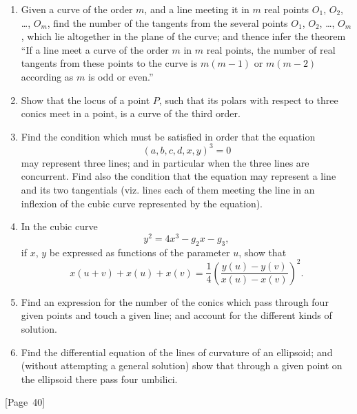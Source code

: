 \documentclass[11pt,a4paper]{book}
\providecommand{\between}{,}
\begin{document}
\begin{enumerate}
\item Given a curve of the order $m$, and a line meeting it in $m$ real
points $O_1$, $O_2$, \dots, $O_m$, find the number of the tangents from
the several points $O_1$, $O_2$, \dots, $O_m$, which lie altogether in the
plane of the curve; and thence infer the theorem ``If a line meet a
curve of the order $m$ in $m$ real points, the number of real tangents
from these points to the curve is $m(m-1)$ or $m(m-2)$ according as $m$
is odd or even.''

\item Show that the locus of a point $P$, such that its polars with
respect to three conics meet in a point, is a curve of the third order.

\item Find the condition which must be satisfied in order that the equation
\[
(a,b,c,d\between x,y)^3 = 0
\]
may represent three lines; and in particular when the three lines are
concurrent. Find also the condition that the equation may represent a
line and its two tangentials (viz. lines each of them meeting the line
in an inflexion of the cubic curve represented by the equation).

\item In the cubic curve
\[
y^2 = 4x^3 - g_2x - g_3,
\]
if $x$, $y$ be expressed as functions of the parameter $u$, show that
\[
x(u+v) + x(u) + x(v) = \frac{1}{4}\left(
\frac{y(u) - y(v)}{x(u) - x(v)} \right)^2.
\]

\item Find an expression for the number of the conics which pass through
four given points and touch a given line; and account for the different
kinds of solution.

\item Find the differential equation of the lines of curvature of an
ellipsoid; and (without attempting a general solution) show that through
a given point on the ellipsoid there pass four umbilici.
\end{enumerate}

\begin{center}
[Page~40]
\end{center}
\end{document}
